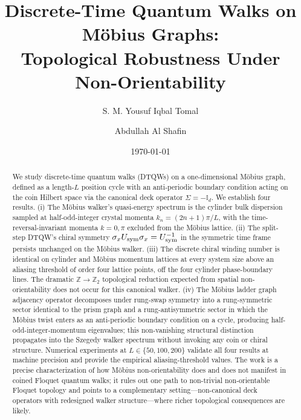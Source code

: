 \documentclass[aps,pra,reprint,amsmath,amssymb,superscriptaddress,nofootinbib,longbibliography]{revtex4-2}
\newcommand{\Z}{\mathbb{Z}}
\newcommand{\I}{\mathbb{I}}
\newcommand{\sigx}{\sigma_x}
\begin{document}
\title{Discrete-Time Quantum Walks on M\"obius Graphs:\\
       Topological Robustness Under Non-Orientability}

\author{S. M. Yousuf Iqbal Tomal}

\author{Abdullah Al Shafin}

\date{\today}

\begin{abstract}
We study discrete-time quantum walks (DTQWs) on a one-dimensional M\"obius graph, defined as a length-$L$ position cycle with an anti-periodic boundary condition acting on the coin Hilbert space via the canonical deck operator $\Sigma = -\I_d$. We establish four results. (i) The M\"obius walker's quasi-energy spectrum is the cylinder bulk dispersion sampled at half-odd-integer crystal momenta $k_n = (2n+1)\pi/L$, with the time-reversal-invariant momenta $k = 0, \pi$ excluded from the M\"obius lattice. (ii) The split-step DTQW's chiral symmetry $\sigx U_{\rm sym} \sigx = U_{\rm sym}^{-1}$ in the symmetric time frame persists unchanged on the M\"obius walker. (iii) The discrete chiral winding number is identical on cylinder and M\"obius momentum lattices at every system size above an aliasing threshold of order four lattice points, off the four cylinder phase-boundary lines. The dramatic $\Z \to \Z_2$ topological reduction expected from spatial non-orientability does not occur for this canonical walker. (iv) The M\"obius ladder graph adjacency operator decomposes under rung-swap symmetry into a rung-symmetric sector identical to the prism graph and a rung-antisymmetric sector in which the M\"obius twist enters as an anti-periodic boundary condition on a cycle, producing half-odd-integer-momentum eigenvalues; this non-vanishing structural distinction propagates into the Szegedy walker spectrum without invoking any coin or chiral structure. Numerical experiments at $L \in \{50, 100, 200\}$ validate all four results at machine precision and provide the empirical aliasing-threshold values. The work is a precise characterization of how M\"obius non-orientability does and does not manifest in coined Floquet quantum walks; it rules out one path to non-trivial non-orientable Floquet topology and points to a complementary setting---non-canonical deck operators with redesigned walker structure---where richer topological consequences are likely.
\end{abstract}
\end{document}
